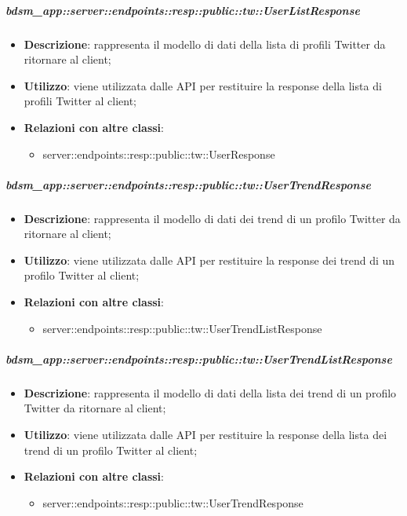     \subparagraph{bdsm\_app::server::endpoints::resp::public::tw::UserListResponse} %
    \label{subp:bdsm_app_server_endpoints_resp_public_tw_userlistresponse}
    \begin{itemize}
      \item \textbf{Descrizione}: rappresenta il modello di dati della lista di profili Twitter da ritornare al client;
      \item \textbf{Utilizzo}: viene utilizzata dalle API per restituire la response della lista di profili Twitter al client;
      \item \textbf{Relazioni con altre classi}:
        \begin{itemize}
          \item server::endpoints::resp::public::tw::UserResponse
        \end{itemize}
      \end{itemize}
    
    \subparagraph{bdsm\_app::server::endpoints::resp::public::tw::UserTrendResponse} %
    \label{subp:bdsm_app_server_endpoints_resp_public_tw_usertrendresponse}
    \begin{itemize}
      \item \textbf{Descrizione}: rappresenta il modello di dati dei trend di un profilo Twitter da ritornare al client;
      \item \textbf{Utilizzo}: viene utilizzata dalle API per restituire la response dei trend di un profilo Twitter al client;
      \item \textbf{Relazioni con altre classi}:
        \begin{itemize}
          \item server::endpoints::resp::public::tw::UserTrendListResponse
        \end{itemize}
      \end{itemize}
    
    \subparagraph{bdsm\_app::server::endpoints::resp::public::tw::UserTrendListResponse} %
    \label{subp:bdsm_app_server_endpoints_resp_public_tw_usertrendlistresponse}
    \begin{itemize}
      \item \textbf{Descrizione}: rappresenta il modello di dati della lista dei trend di un profilo Twitter da ritornare al client;
      \item \textbf{Utilizzo}: viene utilizzata dalle API per restituire la response della lista dei trend di un profilo Twitter al client;
      \item \textbf{Relazioni con altre classi}:
        \begin{itemize}
          \item server::endpoints::resp::public::tw::UserTrendResponse
        \end{itemize}
      \end{itemize}
    
